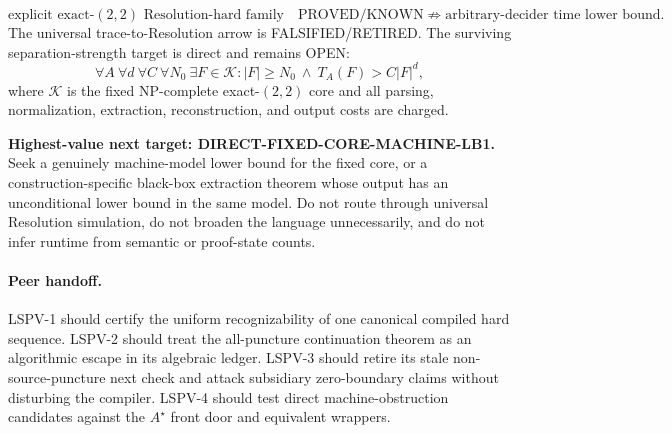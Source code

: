 \documentclass[11pt]{article}
\begin{document}
\[
\boxed{\text{explicit exact-$(2,2)$ Resolution-hard family}\quad
\text{PROVED/KNOWN}}
\not\Longrightarrow
\boxed{\text{arbitrary-decider time lower bound}}.
\]
The universal trace-to-Resolution arrow is FALSIFIED/RETIRED.  The surviving
separation-strength target is direct and remains OPEN:
\[
 \forall A\ \forall d\ \forall C\ \forall N_0\ \exists F\in\mathcal K:
 |F|\ge N_0\ \land\ T_A(F)>C|F|^d,
\]
where $\mathcal K$ is the fixed NP-complete exact-$(2,2)$ core and all parsing,
normalization, extraction, reconstruction, and output costs are charged.

\noindent\textbf{Highest-value next target: DIRECT-FIXED-CORE-MACHINE-LB1.}
Seek a genuinely machine-model lower bound for the fixed core, or a
construction-specific black-box extraction theorem whose output has an
unconditional lower bound in the same model.  Do not route through universal
Resolution simulation, do not broaden the language unnecessarily, and do not
infer runtime from semantic or proof-state counts.

\paragraph{Peer handoff.}
LSPV-1 should certify the uniform recognizability of one canonical compiled
hard sequence.  LSPV-2 should treat the all-puncture continuation theorem as
an algorithmic escape in its algebraic ledger.  LSPV-3 should retire its stale
non-source-puncture next check and attack subsidiary zero-boundary claims
without disturbing the compiler.  LSPV-4 should test direct machine-obstruction
candidates against the $A^\star$ front door and equivalent wrappers.

\end{document}
